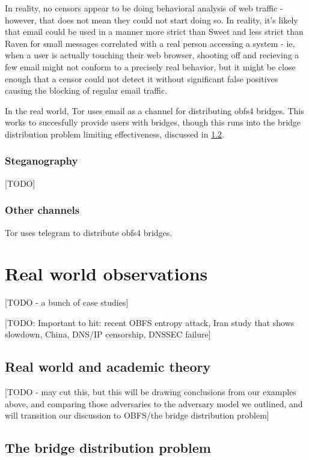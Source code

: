\documentclass[12pt]{report}
\begin{document}
In reality, no censors appear to be doing behavioral analysis of web traffic - however, that does not mean they could not start doing so. In reality, it's likely that email could be used in a manner more strict than Sweet and less strict than Raven for small messages correlated with a real person accessing a system - ie, when a user is actually touching their web browser, shooting off and recieving a few email might not conform to a precisely real behavior, but it might be close enough that a censor could not detect it without significant false positives causing the blocking of regular email traffic.

In the real world, Tor uses email as a channel for distributing obfs4 bridges. This works to succesfully provide users with bridges, though this runs into the bridge distribution problem limiting effectiveness, discussed in \ref{distribution}.

\subsubsection{Steganography}

[TODO]

\subsubsection{Other channels}

Tor uses telegram to distribute obfs4 bridges.\cite{telegram}

\section{Real world observations}
\label{real}

[TODO - a bunch of case studies]

[TODO: Important to hit: recent OBFS entropy attack, Iran study that shows slowdown, China, DNS/IP censorship, DNSSEC failure]

\subsection{Real world and academic theory}

[TODO - may cut this, but this will be drawing conclusions from our examples above, and comparing those adversaries to the adversary model we outlined, and will transition our discussion to OBFS/the bridge distribution problem]

\subsection{The bridge distribution problem}
\label{distribution}
\end{document}
